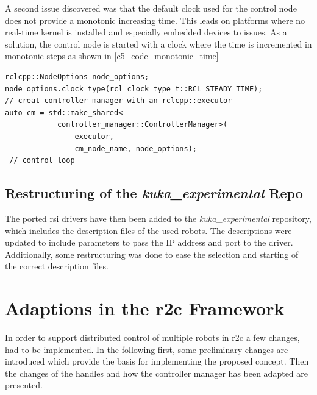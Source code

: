 A second issue discovered was that the default clock used for the control node does not provide a monotonic increasing time. This leads on platforms where no real-time kernel is installed and especially embedded devices to issues. As a solution, the control node is started with a clock where the time is incremented in monotonic steps as shown in \autoref{c5_code_monotonic_time}
\lstset{language=C++,basicstyle=\small}
\begin{lstlisting}[caption=Small code extract for setting monotonic clock.,label=c5_code_monotonic_time]
rclcpp::NodeOptions node_options;
node_options.clock_type(rcl_clock_type_t::RCL_STEADY_TIME);
// creat controller manager with an rclcpp::executor
auto cm = std::make_shared<
            controller_manager::ControllerManager>(
                executor,
                cm_node_name, node_options);
 // control loop
\end{lstlisting}

\subsection{Restructuring of the \textit{kuka\_experimental} Repo}
The ported \gls{rsi} drivers have then been added to the \textit{kuka\_experimental} repository, which includes the description files of the used robots. The descriptions were updated to include parameters to pass the IP address and port to the driver. Additionally, some restructuring was done to ease the selection and starting of the correct description files. 

\section{Adaptions in the \gls{r2c} Framework}
In order to support distributed control of multiple robots in \gls{r2c} a few changes, had to be implemented. In the following first, some preliminary changes are introduced which provide the basis for implementing the proposed concept. Then the changes of the \glspl{handle} and how the controller manager has been adapted are presented.


